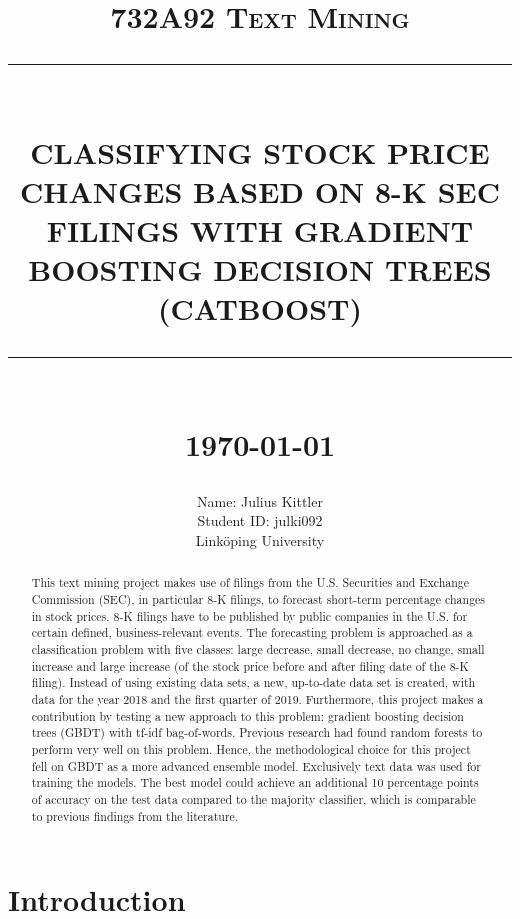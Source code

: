 \documentclass{article}
\newcommand{\HRule}[1]{\rule{\linewidth}{#1}}
\begin{document}
	
	\title{\textsc{732A92 Text Mining} \\ [2.0cm]
		\HRule{0.5pt} \\
		\LARGE \textbf{\uppercase{Classifying Stock Price Changes based on 8-K SEC filings with Gradient Boosting Decision Trees (CatBoost)}}
		\HRule{2pt} \\ [0.5cm]
		\normalsize \today \vspace*{5\baselineskip}}
	
	\date{}
	
	\author{
		Name: Julius Kittler \\ 
		Student ID: julki092 \\ 
		Link\"{o}ping University}
	
	\maketitle
	\newpage
	
	\begin{abstract}
		
	This text mining project makes use of filings from the U.S. Securities and Exchange Commission (SEC), in particular 8-K filings, to forecast short-term percentage changes in stock prices. 8-K filings have to be published by public companies in the U.S. for certain defined, business-relevant events. The forecasting problem is approached as a classification problem with five classes: large decrease, small decrease, no change, small increase and large increase (of the stock price before and after filing date of the 8-K filing). Instead of using existing data sets, a new, up-to-date data set is created, with data for the year 2018 and the first quarter of 2019. Furthermore, this project makes a contribution by testing a new approach to this problem: gradient boosting decision trees (GBDT) with tf-idf bag-of-words. Previous research had found random forests to perform very well on this problem. Hence, the methodological choice for this project fell on GBDT as a more advanced ensemble model. Exclusively text data was used for training the models. The best model could achieve an additional 10 percentage points of accuracy on the test data compared to the majority classifier, which is comparable to previous findings from the literature.
	
	\end{abstract}

	\newpage
	\tableofcontents
	\newpage
	\listoffigures
	\listoftables
	\newpage

	\section{Introduction}
	
\end{document}

